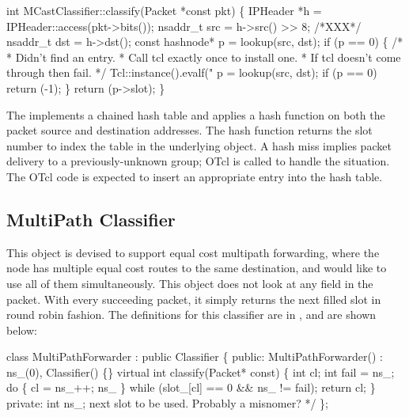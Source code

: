 {{\begin{program}
        int MCastClassifier::classify(Packet *const pkt)
        \{
                IPHeader *h = IPHeader::access(pkt->bits());
                nsaddr_t src = h->src() >> 8; /*XXX*/
                nsaddr_t dst = h->dst();
                const hashnode* p = lookup(src, dst);
                if (p == 0) \{
                        /*
                         * Didn't find an entry.
                         * Call tcl exactly once to install one.
                         * If tcl doesn't come through then fail.
                         */
                        Tcl::instance().evalf("%
                        p = lookup(src, dst);
                        if (p == 0)
                                return (-1);
                \}
                return (p->slot);
        \}
\end{program}
The   implements a chained hash table
and applies a hash function on both the packet source and
destination addresses.
The hash function returns the slot number
to index the  table in the underlying object.
A hash miss implies packet delivery to a previously-unknown group;
OTcl is called to handle the situation.
The OTcl code is expected to insert an appropriate entry into the hash table.

\subsection{MultiPath Classifier}
\label{sec:node:mpath-classifier}

This object is devised to support equal cost multipath
forwarding, where the node has multiple equal cost routes
to the same destination, and would like to use all of them
simultaneously.
This object does not look at any field in the packet.
With every succeeding packet, 
it simply returns the next filled slot in round robin fashion.
The definitions for this classifier are in ,
and are shown below:
\begin{program}
class MultiPathForwarder : public Classifier \{
public:
        MultiPathForwarder() : ns_(0), Classifier() \{\} 
        virtual int classify(Packet* const) \{
                int cl;
                int fail = ns_;
                do \{
                        cl = ns_++;
                        ns_ %
                \} while (slot_[cl] == 0 && ns_ != fail);
                return cl;
        \}
private:
        int ns_;     \* next slot to be used.  Probably a misnomer? */
\};
\end{program}

}}
